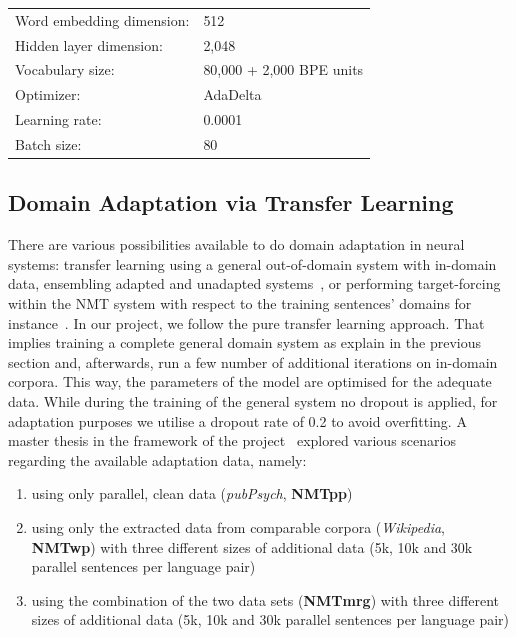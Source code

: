 \documentclass[a4paper,11pt]{article}
\begin{document}
\bigskip
\begin{tabular}{ll}
Word embedding dimension: & 512\\
Hidden layer dimension: & 2,048\\
Vocabulary size: & 80,000 + 2,000 BPE units\\
Optimizer: & AdaDelta\\
Learning rate: & 0.0001\\
Batch size: & 80\\
\end{tabular}



\subsection{Domain Adaptation via Transfer Learning}
\label{ss:adptNmt}

There are various possibilities available to do domain adaptation in neural systems: transfer learning using a general out-of-domain system with in-domain data, ensembling adapted and unadapted systems~\cite{freitag2016fast}, or performing target-forcing within the NMT system with respect to the training sentences' domains for instance~\cite{Chu2017AnEC}.
In our project, we follow the pure transfer learning approach. That implies training a complete general domain system as explain in the previous section and, afterwards, run a few number of additional iterations on in-domain corpora. This way, the parameters of the model are optimised for the adequate data. While during the training of the general system no dropout is applied, for adaptation purposes we utilise a dropout rate of 0.2 to avoid overfitting. 
A master thesis in the framework of the project~\cite{tesisAdam} explored various scenarios regarding the available adaptation data, namely: 

\begin{enumerate}
\itemsep0em
	\item\label{i:pp} using only parallel, clean data (\textit{pubPsych}, {\bf NMTpp})
	\item using only the extracted data from comparable corpora (\textit{Wikipedia}, {\bf NMTwp}) with three different sizes of additional data (5k, 10k and 30k parallel sentences per language pair)
	\item using the combination of the two data sets ({\bf NMTmrg}) with three different sizes of additional data (5k, 10k and 30k parallel sentences per language pair)
\end{enumerate}
\end{document}
